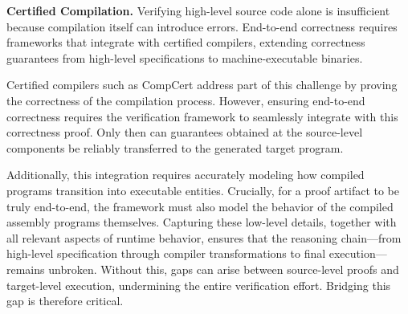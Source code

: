 \begin{challenge}
  \label{challenge:compilation}
  \textbf{Certified Compilation.}
  Verifying high-level source code alone is insufficient
  because compilation itself can introduce errors.
  End-to-end correctness requires frameworks
  that integrate with certified compilers,
  extending correctness guarantees
  from high-level specifications to machine-executable binaries.

  Certified compilers such as CompCert
  address part of this challenge
  by proving the correctness
  of the compilation process.
  However, ensuring end-to-end correctness
  requires the verification framework
  to seamlessly integrate with this correctness proof.
  Only then can guarantees obtained
  at the source-level components be reliably
  transferred to the generated target program.

  Additionally,
  this integration requires accurately modeling
  how compiled programs transition into executable entities.
  Crucially, for a proof artifact to be truly end-to-end,
  the framework must also model
  the behavior of the compiled assembly programs themselves.
  Capturing these low-level details,
  together with all relevant aspects of
  runtime behavior,
  ensures that the reasoning chain---from high-level specification
  through compiler transformations to final execution---remains unbroken.
  Without this,
  gaps can arise between source-level proofs
  and target-level execution,
  undermining the entire verification effort.
  Bridging this gap is therefore critical.

\end{challenge}

